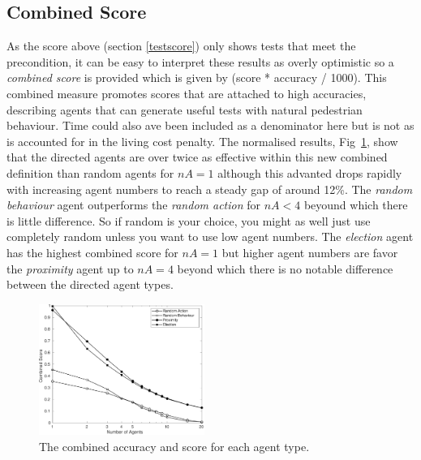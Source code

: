 \documentclass[letterpaper, 10 pt, journal, twoside]{IEEEtran}
\begin{document}
\subsection{Combined Score}
As the score above (section \ref{testscore}) only shows tests that meet the precondition, it can be easy to interpret these results as overly optimistic so a \textit{combined score} is provided which is given by (score * accuracy / 1000). This combined measure promotes scores that are attached to high accuracies, describing agents that can generate useful tests with natural pedestrian behaviour. Time could also ave been included as a denominator here but is not as is accounted for in the living cost penalty.%
%
The normalised results, Fig~\ref{Combined}, show that the directed agents are over twice as effective within this new combined definition than random agents for $nA=1$ although this advanted drops rapidly with increasing agent numbers to reach a steady gap of around 12\%.
%
The \textit{random behaviour} agent outperforms the \textit{random action} for $nA<4$ beyound which there is little difference. So if random is your choice, you might as well just use completely random unless you want to use low agent numbers. %
%
The \textit{election} agent has the highest combined score for $nA=1$ but higher agent numbers are favor the \textit{proximity} agent up to $nA=4$ beyond which there is no notable difference between the directed agent types. %
%

\begin{figure}[!t]
	\centering
\includegraphics[width=0.48\textwidth]{Combined.pdf}
	\caption{The combined accuracy and score for each agent type.}
	\label{Combined}
\end{figure}



\end{document}
